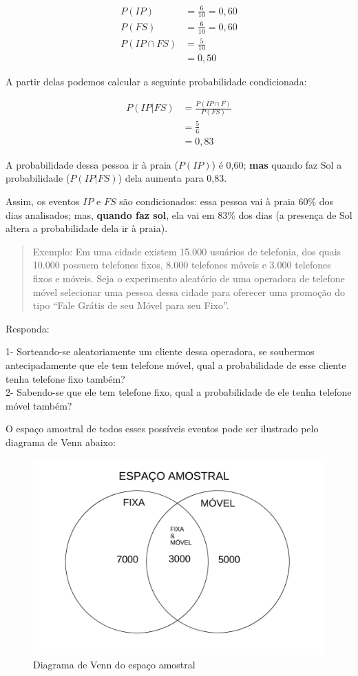 \documentclass[
]{book}
\begin{document}
\begin{align*}
P(IP) & = \frac{6}{10}= 0,60 \\
P(FS) & = \frac{6}{10}= 0,60 \\
P(IP \cap FS) & = \frac{5}{10} \\
    & = 0,50 
\end{align*}

A partir delas podemos calcular a seguinte probabilidade condicionada:

\begin{align*}
P(IP|FS) & = \frac{ P(IP \cap F)}{ P(FS)} \\
       & = \frac{5}{6} \\
       & = 0,83     
\end{align*}

A probabilidade dessa pessoa ir à praia (\(P(IP)\)) é 0,60; \textbf{mas} quando faz Sol a probabilidade (\(P(IP|FS)\)) dela aumenta para 0,83.

Assim, os eventos \(IP\) e \(FS\) são condicionados: essa pessoa vai à praia 60\% dos dias analisados; mas, \textbf{quando faz sol}, ela vai em 83\% dos dias (a presença de Sol altera a probabilidade dela ir à praia).

\begin{quote}
Exemplo: Em uma cidade existem 15.000 usuários de telefonia, dos quais 10.000 possuem telefones fixos, 8.000 telefones móveis e 3.000 telefones fixos e móveis. Seja o experimento aleatório de uma operadora de telefone móvel selecionar uma pessoa dessa cidade para oferecer uma promoção do tipo ``Fale Grátis de seu Móvel para seu Fixo''.
\end{quote}

Responda:

1- Sorteando-se aleatoriamente um cliente dessa operadora, se soubermos antecipadamente que ele tem telefone móvel, qual a probabilidade de esse cliente tenha telefone fixo também?\\
2- Sabendo-se que ele tem telefone fixo, qual a probabilidade de ele tenha telefone móvel também?

O espaço amostral de todos esses possíveis eventos pode ser ilustrado pelo diagrama de Venn abaixo:

\hfill\break

\begin{figure}

{\centering \includegraphics[width=0.5\linewidth]{images4/exercicio} 

}

\caption{Diagrama de Venn do espaço amostral}\label{fig:venn}
\end{figure}
\end{document}
